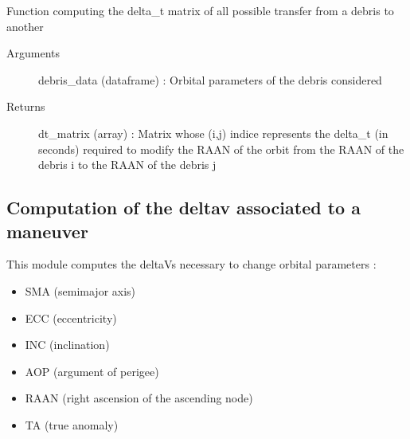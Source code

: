 \documentclass[letterpaper,10pt,english]{sphinxmanual}
\begin{document}
\begin{fulllineitems}
\label{\detokenize{regroupement/dV_computations:regroupement.dV_computations.compute_dt_alignment.compute_dt_matrix}}
Function computing the delta\_t matrix of all possible transfer from a debris to another
\begin{description}
\item[{Arguments}] \leavevmode{[}{]}
debris\_data (dataframe) : Orbital parameters of the debris considered

\item[{Returns}] \leavevmode{[}{]}
dt\_matrix (array) : Matrix whose (i,j) indice represents the delta\_t (in seconds) required to modify the RAAN of the orbit from the RAAN of the debris i to the RAAN of the debris j

\end{description}

\end{fulllineitems}



\subsection{Computation of the delta\sphinxhyphen{}v associated to a maneuver}
\label{\detokenize{regroupement/dV_computations:computation-of-the-delta-v-associated-to-a-maneuver}}\label{\detokenize{regroupement/dV_computations:module-regroupement.dV_computations.maneuvers_dV}}
This module computes the delta\sphinxhyphen{}Vs necessary to change orbital parameters :
\begin{itemize}
\item {} 
SMA (semi\sphinxhyphen{}major axis)

\item {} 
ECC (eccentricity)

\item {} 
INC (inclination)

\item {} 
AOP (argument of perigee)

\item {} 
RAAN (right ascension of the ascending node)

\item {} 
TA (true anomaly)

\end{itemize}
\end{document}
